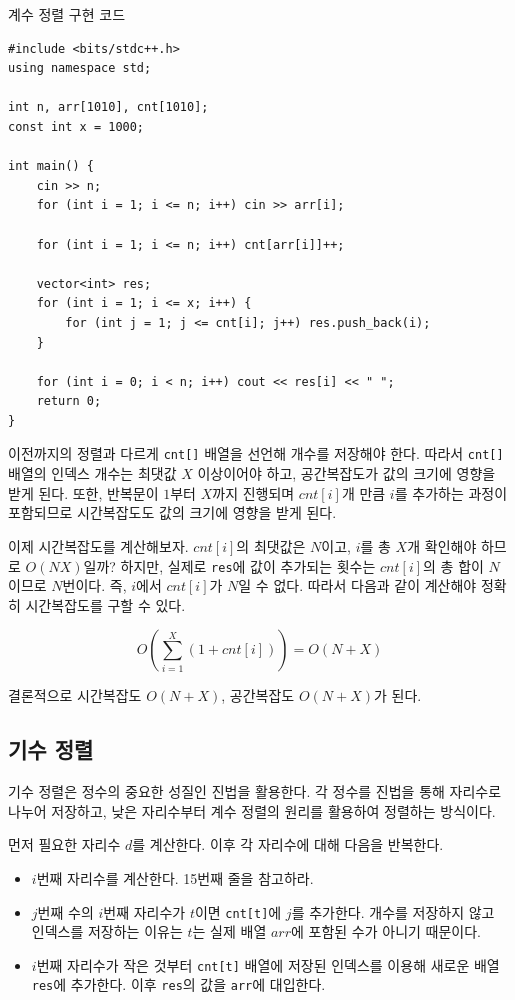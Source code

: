 \begin{code}
계수 정렬 구현 코드
\begin{lstlisting}
#include <bits/stdc++.h>
using namespace std;

int n, arr[1010], cnt[1010];
const int x = 1000;

int main() {
    cin >> n;
    for (int i = 1; i <= n; i++) cin >> arr[i];

    for (int i = 1; i <= n; i++) cnt[arr[i]]++;

    vector<int> res;
    for (int i = 1; i <= x; i++) {
        for (int j = 1; j <= cnt[i]; j++) res.push_back(i);
    }

    for (int i = 0; i < n; i++) cout << res[i] << " ";
    return 0;
}
\end{lstlisting}
\end{code}

이전까지의 정렬과 다르게 \texttt{cnt[]} 배열을 선언해 개수를 저장해야 한다. 따라서 \texttt{cnt[]} 배열의 인덱스 개수는 최댓값 $X$ 이상이어야 하고, 공간복잡도가 값의 크기에 영향을 받게 된다. 또한, 반복문이 $1$부터 $X$까지 진행되며 $cnt[i]$개 만큼 $i$를 추가하는 과정이 포함되므로 시간복잡도도 값의 크기에 영향을 받게 된다.

이제 시간복잡도를 계산해보자. $cnt[i]$의 최댓값은 $N$이고, $i$를 총 $X$개 확인해야 하므로 $O(NX)$일까? 하지만, 실제로 \texttt{res}에 값이 추가되는 횟수는 $cnt[i]$의 총 합이 $N$이므로 $N$번이다. 즉, $i$에서 $cnt[i]$가 $N$일 수 없다. 따라서 다음과 같이 계산해야 정확히 시간복잡도를 구할 수 있다.

$$O\left(\sum_{i=1}^X {(1+cnt[i])}\right) = O(N+X)$$

결론적으로 시간복잡도 $O(N+X)$, 공간복잡도 $O(N+X)$가 된다.

\subsection{기수 정렬}
기수 정렬은 정수의 중요한 성질인 진법을 활용한다. 각 정수를 진법을 통해 자리수로 나누어 저장하고, 낮은 자리수부터 계수 정렬의 원리를 활용하여 정렬하는 방식이다.

먼저 필요한 자리수 $d$를 계산한다. 이후 각 자리수에 대해 다음을 반복한다.
\begin{itemize}
    \item $i$번째 자리수를 계산한다. 15번째 줄을 참고하라.
    \item $j$번째 수의 $i$번째 자리수가 $t$이면 \texttt{cnt[t]}에 $j$를 추가한다. 개수를 저장하지 않고 인덱스를 저장하는 이유는 $t$는 실제 배열 $arr$에 포함된 수가 아니기 때문이다.
    \item $i$번째 자리수가 작은 것부터 \texttt{cnt[t]} 배열에 저장된 인덱스를 이용해 새로운 배열 \texttt{res}에 추가한다. 이후 \texttt{res}의 값을 \texttt{arr}에 대입한다.
\end{itemize}

